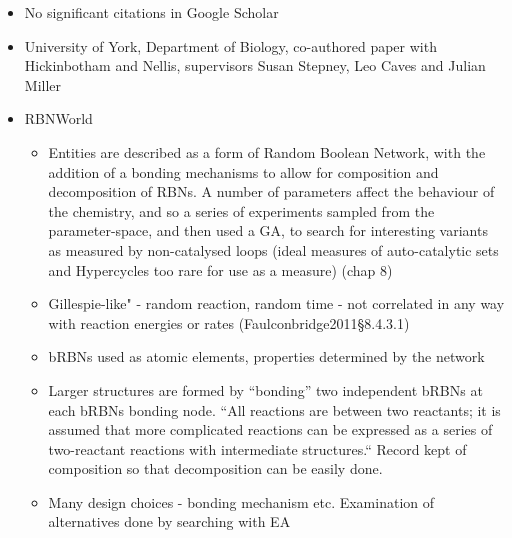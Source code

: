 		\begin{itemize}
			\item
			
			No significant citations in Google Scholar
			
			\item
			
			University of York, Department of Biology, co-authored paper with
			Hickinbotham and Nellis, supervisors Susan Stepney, Leo Caves and
			Julian Miller
			
			\item
			
			RBNWorld
			
			
			\begin{itemize}
				\item
				
				Entities are described as a form of Random Boolean Network, with the
				addition of a bonding mechanisms to allow for composition and
				decomposition of RBNs. A number of parameters affect the behaviour
				of the chemistry, and so a series of experiments sampled from the
				parameter-space, and then used a GA, to search for interesting
				variants as measured by non-catalysed loops (ideal measures of
				auto-catalytic sets and Hypercycles too rare for use as a measure)
				(chap 8)
				
				\item
				
				Gillespie-like" - random reaction, random time - not correlated in
				any way with reaction energies or rates (Faulconbridge2011§8.4.3.1)
				
				\item
				
				bRBNs used as atomic elements, properties determined by the network
				
				\item
				
				Larger structures are formed by ``bonding'' two independent bRBNs at
				each bRBNs bonding node. ``All reactions are between two reactants;
				it is assumed that more complicated reactions can be expressed as a
				series of two-reactant reactions with intermediate structures.``
				Record kept of composition so that decomposition can be easily done.
				
				\item
				
				Many design choices - bonding mechanism etc. Examination of
				alternatives done by searching with EA
				

\end{itemize}
\end{itemize}

